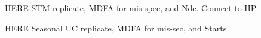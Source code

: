 \documentclass[a4paper]{book}
\begin{document}
% 

 




HERE  STM replicate, MDFA for mis-spec, and Ndc.  Connect to HP
 

HERE  Seasonal UC replicate, MDFA for mis-sec, and Starts


% 
% 
%  
% 
% 
\end{document}
